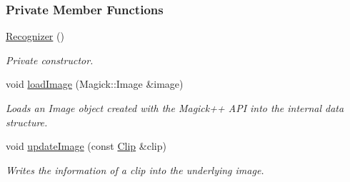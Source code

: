 \subsubsection*{Private Member Functions}
\begin{CompactItemize}
\item 
\hyperlink{class_recognizer_4bf77b760d8dbc50c4ef50cad433db40}{Recognizer} ()
\begin{CompactList}\small\item\em Private constructor. \item\end{CompactList}\item 
void \hyperlink{class_recognizer_acc4244738f2577a0c344c3b3af22eb0}{loadImage} (Magick::Image \&image)
\begin{CompactList}\small\item\em Loads an Image object created with the Magick++ API into the internal data structure. \item\end{CompactList}\item 
void \hyperlink{class_recognizer_0779d8bb035f7d51cb26fdc3d410e019}{updateImage} (const \hyperlink{class_clip}{Clip} \&clip)
\begin{CompactList}\small\item\em Writes the information of a clip into the underlying image. \item\end{CompactList}\end{CompactItemize}
